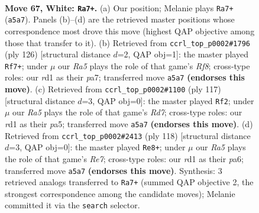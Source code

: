 \documentclass[11pt]{article}
\begin{document}
\clearpage

\begin{figure}[p]\centering
\begin{subfigure}{0.46\textwidth}\centering
\resizebox{\linewidth}{!}{%
\newchessgame
\chessboard[
  setfen={8/7k/8/R7/5K2/1r6/7P/3r4 w - - 1 67},
  showmover=false,
  pgfstyle=straightmove, color=movearrow, markmove={a5-a7}
]}
\caption{}
\end{subfigure}\hfill
\begin{subfigure}{0.46\textwidth}\centering
\resizebox{\linewidth}{!}{%
\newchessgame
\chessboard[
  setfen={5R2/p6k/8/8/7K/2r5/6P1/8 w - - 1 64},
  showmover=false,
  pgfstyle=straightmove, color=movearrow, markmove={f8-f7}
]}
\caption{}
\end{subfigure}
\\[4pt]
\begin{subfigure}{0.46\textwidth}\centering
\resizebox{\linewidth}{!}{%
\newchessgame
\chessboard[
  setfen={8/8/2K2k2/P6p/1R6/8/3r4/8 b - - 31 59},
  showmover=false,
  pgfstyle=straightmove, color=movearrow, markmove={d2-f2}
]}
\caption{}
\end{subfigure}\hfill
\begin{subfigure}{0.46\textwidth}\centering
\resizebox{\linewidth}{!}{%
\newchessgame
\chessboard[
  setfen={1k6/4R3/p7/8/7r/1P6/8/1K6 w - - 18 60},
  showmover=false,
  pgfstyle=straightmove, color=movearrow, markmove={e7-e8}
]}
\caption{}
\end{subfigure}
\caption{\textbf{Move 67, White: \texttt{Ra7+}.} (a) Our position; Melanie plays \texttt{Ra7+} (\texttt{a5a7}). Panels (b)--(d) are the retrieved master positions whose correspondence most drove this move (highest QAP objective among those that transfer to it). (b) Retrieved from \texttt{ccrl\_top\_p0002\#1796} (ply 126) [structural distance $d$=2, QAP obj=1]: the master played \texttt{Rf7+}; under $\mu$ our \emph{Ra5} plays the role of that game's \emph{Rf8}; cross-type roles: our \emph{r}d1 as their \emph{p}a7; transferred move \texttt{a5a7} \textbf{(endorses this move)}. (c) Retrieved from \texttt{ccrl\_top\_p0002\#1100} (ply 117) [structural distance $d$=3, QAP obj=0]: the master played \texttt{Rf2}; under $\mu$ our \emph{Ra5} plays the role of that game's \emph{Rd7}; cross-type roles: our \emph{r}d1 as their \emph{p}a5; transferred move \texttt{a5a7} \textbf{(endorses this move)}. (d) Retrieved from \texttt{ccrl\_top\_p0002\#2413} (ply 118) [structural distance $d$=3, QAP obj=0]: the master played \texttt{Re8+}; under $\mu$ our \emph{Ra5} plays the role of that game's \emph{Re7}; cross-type roles: our \emph{r}d1 as their \emph{p}a6; transferred move \texttt{a5a7} \textbf{(endorses this move)}. Synthesis: 3 retrieved analogs transferred to \texttt{Ra7+} (summed QAP objective 2, the strongest correspondence among the candidate moves); Melanie committed it via the \texttt{search} selector.}
\label{fig:thought-m132}
\end{figure}
\end{document}
